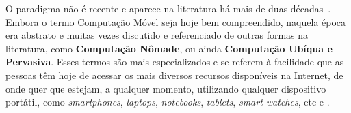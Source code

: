 \documentclass[	12pt, Times, openright, twoside, a4paper, english, brazil]{abntex2}
\newcommand{\bkc}[1]{{\color{blue}{#1}}} %
\begin{document}

O paradigma não é recente e aparece na literatura há mais de duas décadas~\cite{mobilecomputing}. Embora o termo Computação Móvel seja hoje bem compreendido, naquela época era abstrato e muitas vezes discutido e referenciado de outras formas na literatura, como \textbf{Computação Nômade}, ou ainda \textbf{Computação Ubíqua e Pervasiva}. Esses termos são mais especializados e se referem à facilidade que as pessoas têm hoje de acessar os mais diversos recursos disponíveis na Internet, de onde quer que estejam, a qualquer momento,  utilizando qualquer dispositivo portátil, como  \textit{smartphones}, \textit{laptops}, \textit{notebooks}, \textit{tablets}, \textit{smart watches}, etc \cite{rouse2007nomadic} e \cite{lyytinen2002ubiquitous}. 
\end{document}
